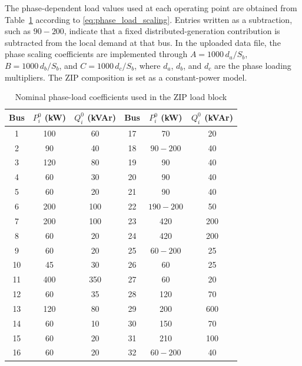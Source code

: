 \documentclass[journal]{IEEEtran}
\begin{document}
The phase-dependent load values used at each operating point are obtained from
Table~\ref{tab:appendix_load_data} according to
\eqref{eq:phase_load_scaling}. Entries written as a subtraction, such as
$90-200$, indicate that a fixed distributed-generation contribution is
subtracted from the local demand at that bus. In the uploaded data file, the
phase scaling coefficients are implemented through $A=1000\,d_a/S_b$,
$B=1000\,d_b/S_b$, and $C=1000\,d_c/S_b$, where $d_a$, $d_b$, and $d_c$ are
the phase loading multipliers. The ZIP composition is set as a constant-power
model.

\begin{table}[H]
\centering
\scriptsize
\caption{Nominal phase-load coefficients used in the ZIP load block}
\label{tab:appendix_load_data}
\setlength{\tabcolsep}{6pt}
\renewcommand{\arraystretch}{1.0}
\begin{tabular}{@{}ccc|ccc@{}}
\toprule
Bus & $P_i^0$ (kW) & $Q_i^0$ (kVAr) &
Bus & $P_i^0$ (kW) & $Q_i^0$ (kVAr) \\
\midrule
1  & 100 & 60  & 17 & 70 & 20 \\
2  & 90  & 40  & 18 & $90-200$ & 40 \\
3  & 120 & 80  & 19 & 90 & 40 \\
4  & 60  & 30  & 20 & 90 & 40 \\
5  & 60  & 20  & 21 & 90 & 40 \\
6  & 200 & 100 & 22 & $190-200$ & 50 \\
7  & 200 & 100 & 23 & 420 & 200 \\
8  & 60  & 20  & 24 & 420 & 200 \\
9  & 60  & 20  & 25 & $60-200$ & 25 \\
10 & 45  & 30  & 26 & 60 & 25 \\
11 & 400 & 350 & 27 & 60 & 20 \\
12 & 60  & 35  & 28 & 120 & 70 \\
13 & 120 & 80  & 29 & 200 & 600 \\
14 & 60  & 10  & 30 & 150 & 70 \\
15 & 60  & 20  & 31 & 210 & 100 \\
16 & 60  & 20  & 32 & $60-200$ & 40 \\
\bottomrule
\end{tabular}
\end{table}
\end{document}
